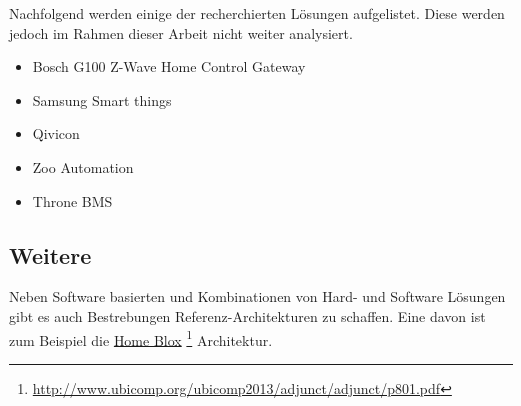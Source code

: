 Nachfolgend werden einige der recherchierten Lösungen aufgelistet. Diese werden jedoch im Rahmen dieser Arbeit nicht weiter analysiert.

\begin{itemize}
\item Bosch G100 Z-Wave Home Control Gateway
\item Samsung Smart things
\item Qivicon
\item Zoo Automation
\item Throne BMS
\end{itemize}

\subsection{Weitere}
Neben Software basierten und Kombinationen von Hard- und Software Lösungen gibt es auch Bestrebungen Referenz-Architekturen zu schaffen. Eine davon ist zum Beispiel die  \hyperlink{http://www.ubicomp.org/ubicomp2013/adjunct/adjunct/p801.pdf}{Home Blox}  \footnote{\url{http://www.ubicomp.org/ubicomp2013/adjunct/adjunct/p801.pdf}} Architektur.


